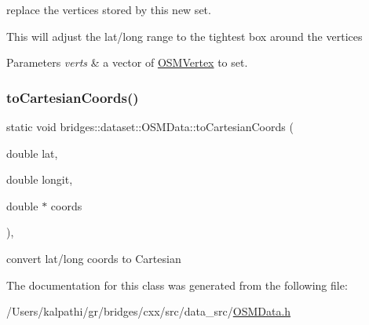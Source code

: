 replace the vertices stored by this new set. 

This will adjust the lat/long range to the tightest box around the vertices


\begin{DoxyParams}{Parameters}
{\em verts} & a vector of \mbox{\hyperlink{classbridges_1_1dataset_1_1_o_s_m_vertex}{O\+S\+M\+Vertex}} to set. \\
\hline
\end{DoxyParams}
\mbox{\label{classbridges_1_1dataset_1_1_o_s_m_data_a519483237352f16f0405137138ee2bd1}} 
\subsubsection{\texorpdfstring{toCartesianCoords()}{toCartesianCoords()}}
{\footnotesize\ttfamily static void bridges\+::dataset\+::\+O\+S\+M\+Data\+::to\+Cartesian\+Coords (\begin{DoxyParamCaption}\item[{double}]{lat,  }\item[{double}]{longit,  }\item[{double $\ast$}]{coords }\end{DoxyParamCaption})\hspace{0.3cm}{\ttfamily [inline]}, {\ttfamily [static]}}

convert lat/long coords to Cartesian 

The documentation for this class was generated from the following file\+:\begin{DoxyCompactItemize}
\item 
/\+Users/kalpathi/gr/bridges/cxx/src/data\+\_\+src/\mbox{\hyperlink{_o_s_m_data_8h}{O\+S\+M\+Data.\+h}}\end{DoxyCompactItemize}
